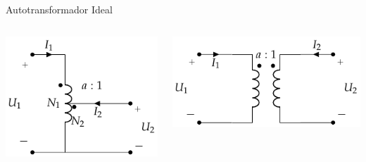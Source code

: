 \documentclass[aspectratio=169, usenames,svgnames,dvipsnames]{beamer}
\begin{document}
\begin{frame}[label={sec:org335bc12}]{Autotransformador Ideal}
\begin{columns}
\begin{column}[b]{0.5\columnwidth}
\begin{center}
\includegraphics[width=.9\linewidth]{../figs/AutoTrafoIdeal.pdf}
\end{center}
\end{column}
\begin{column}[b]{0.5\columnwidth}
\begin{center}
\includegraphics[width=.9\linewidth]{../figs/Trafo_Ideal.pdf}
\end{center}
\end{column}
\end{columns}
\end{frame}
\end{document}
